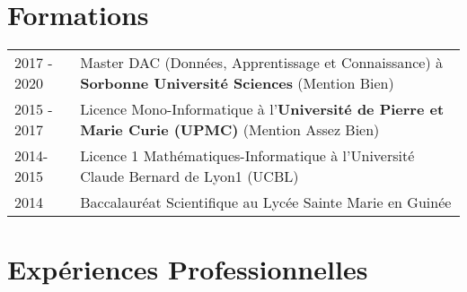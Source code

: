 \documentclass[a4paper,12pt]{article}
\begin{document}
\section{Formations}
\begin{tabularx}{\linewidth}{@{}l X@{}}	
2017 - 2020 & Master DAC (Données, Apprentissage et Connaissance) à \textbf{Sorbonne Université Sciences} \hfill \normalsize (Mention Bien) \\

2015 - 2017 & Licence Mono-Informatique à l'\textbf{Université de Pierre et Marie Curie (UPMC)} \hfill (Mention Assez Bien) \\ 

2014-2015 & Licence 1 Mathématiques-Informatique à l'Université Claude Bernard de Lyon1 (UCBL)\\

2014 & Baccalauréat Scientifique au Lycée Sainte Marie en Guinée \\
\end{tabularx}

\section{Expériences Professionnelles}
\end{document}
